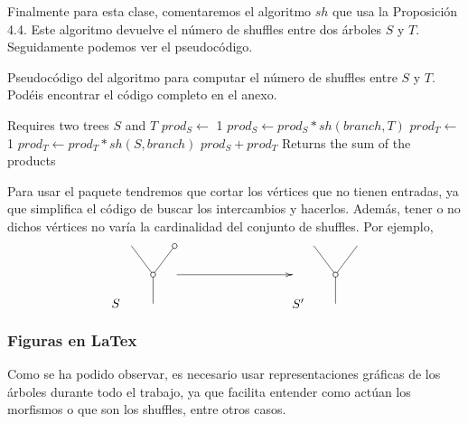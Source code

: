 \documentclass[../main.tex]{subfiles}
\begin{document}
Finalmente para esta clase, comentaremos el algoritmo $sh$ que usa la Proposici\'on 4.4. Este algoritmo devuelve el n\'umero de shuffles entre dos \'arboles $S$ y $T$. Seguidamente podemos ver el pseudoc\'odigo.
\begin{algoritmo}
    \caption{Pseudoc\'odigo del algoritmo para computar el n\'umero de shuffles entre $S$ y $T$. Pod\'eis encontrar el c\'odigo completo en el anexo.}
    \begin{algorithmic}[1]
        \Require Requires two trees $S$ and $T$
        \State{}
        \EndIf
        \State{}
        \EndIf
        \State $prod_S\leftarrow$ 1
        \State $prod_S \leftarrow prod_S * sh(branch, T)$ 
        \EndFor
        \State $prod_T\leftarrow$ 1
        \State $prod_T \leftarrow prod_T * sh(S, branch)$ 
        \EndFor
        \State\Return $prod_S+prod_T$
        \EndFunction
        \Ensure Returns the sum of the products
    \end{algorithmic}
\end{algoritmo}
\newpage
\begin{obs}
    Para usar el paquete tendremos que cortar los v\'ertices que no tienen entradas, ya que simplifica el c\'odigo de buscar los intercambios y hacerlos. Adem\'as, tener o no dichos v\'ertices no var\'ia la cardinalidad del conjunto de shuffles. Por ejemplo,
    $$
        \xy
        <0.08cm, 0cm>:
        (0.0, 0.0)*{}="1"; %
        (0.0, 10.0)*\cir<2pt>{}="2"; %
        (-7.5, 20.0)*{}="3"; %
        (7.5, 20.0)*\cir<2pt>{}="4"; %
        "1";"2" **\dir{-};
        "2";"3" **\dir{-};
        "2";"4" **\dir{-};
        (-13,0)*{S};
        \endxy
        \xy
        <0.08cm, 0cm>:
        (-20, 0.0)*{}="1";
        (20, 10.0)*{}="2";
        {\ar(-20, 10)*{};(20,10)*{}};
        \endxy
        \xy
        <0.08cm, 0cm>:
        (0.0, 0.0)*{}="1"; %
        (0.0, 10.0)*\cir<2pt>{}="2"; %
        (-7.5, 20.0)*{}="3"; %
        (7.5, 20.0)*{}="4"; %
        "1";"2" **\dir{-};
        "2";"3" **\dir{-};
        "2";"4" **\dir{-};
        (-13,0)*{S'};
        \endxy
    $$
\end{obs}

\subsubsection*{Figuras en LaTex}
Como se ha podido observar, es necesario usar representaciones gr\'aficas de los \'arboles durante todo el trabajo, ya que facilita entender como act\'uan los morfismos o que son los shuffles, entre otros casos.
\end{document}
